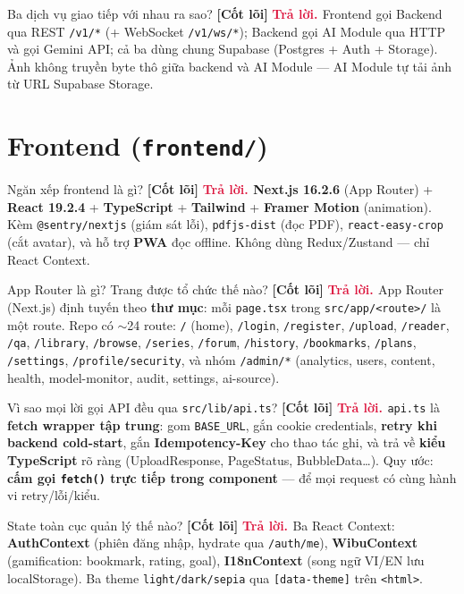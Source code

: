 \documentclass[11pt]{article}
\newcommand{\code}[1]{\texttt{\small #1}}
\newcommand{\B}[1]{\textbf{#1}}
\newcommand{\tagCore}{\textcolor{steel}{\footnotesize\textbf{[Cốt lõi]}}}
\newcommand{\A}{\textbf{\textcolor{crimson}{Trả lời. }}}
\begin{document}
\begin{qa}{Ba dịch vụ giao tiếp với nhau ra sao? \tagCore}
\A Frontend gọi Backend qua REST \code{/v1/*} (+ WebSocket \code{/v1/ws/*}); Backend gọi AI Module qua HTTP và gọi Gemini API; cả ba dùng chung Supabase (Postgres + Auth + Storage). Ảnh không truyền byte thô giữa backend và AI Module --- AI Module tự tải ảnh từ URL Supabase Storage.
\end{qa}

\section{Frontend (\texttt{frontend/})}

\begin{qa}{Ngăn xếp frontend là gì? \tagCore}
\A \B{Next.js 16.2.6} (App Router) + \B{React 19.2.4} + \B{TypeScript} + \B{Tailwind} + \B{Framer Motion} (animation). Kèm \code{@sentry/nextjs} (giám sát lỗi), \code{pdfjs-dist} (đọc PDF), \code{react-easy-crop} (cắt avatar), và hỗ trợ \B{PWA} đọc offline. Không dùng Redux/Zustand --- chỉ React Context.
\end{qa}

\begin{qa}{App Router là gì? Trang được tổ chức thế nào? \tagCore}
\A App Router (Next.js) định tuyến theo \B{thư mục}: mỗi \code{page.tsx} trong \code{src/app/<route>/} là một route. Repo có $\sim$24 route: \code{/} (home), \code{/login}, \code{/register}, \code{/upload}, \code{/reader}, \code{/qa}, \code{/library}, \code{/browse}, \code{/series}, \code{/forum}, \code{/history}, \code{/bookmarks}, \code{/plans}, \code{/settings}, \code{/profile/security}, và nhóm \code{/admin/*} (analytics, users, content, health, model-monitor, audit, settings, ai-source).
\end{qa}

\begin{qa}{Vì sao mọi lời gọi API đều qua \texttt{src/lib/api.ts}? \tagCore}
\A \code{api.ts} là \B{fetch wrapper tập trung}: gom \code{BASE\_URL}, gắn cookie credentials, \B{retry khi backend cold-start}, gắn \B{Idempotency-Key} cho thao tác ghi, và trả về \B{kiểu TypeScript} rõ ràng (UploadResponse, PageStatus, BubbleData\ldots). Quy ước: \B{cấm gọi \code{fetch()} trực tiếp trong component} --- để mọi request có cùng hành vi retry/lỗi/kiểu.
\end{qa}

\begin{qa}{State toàn cục quản lý thế nào? \tagCore}
\A Ba React Context: \B{AuthContext} (phiên đăng nhập, hydrate qua \code{/auth/me}), \B{WibuContext} (gamification: bookmark, rating, goal), \B{I18nContext} (song ngữ VI/EN lưu localStorage). Ba theme \code{light/dark/sepia} qua \code{[data-theme]} trên \code{<html>}.
\end{qa}
\end{document}
